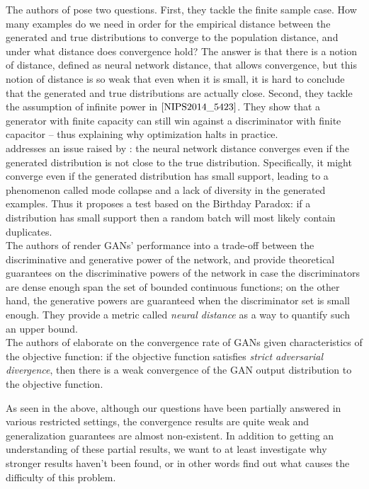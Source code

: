 \documentclass[11pt]{hw-template}
\begin{document}
The authors of \cite{arora2017generalization} pose two questions. First, they tackle the finite sample case. How many examples do we need in order for the empirical distance between the
generated and true distributions to converge to the population distance, and
under what distance does convergence hold? The answer is that there is a notion of distance, defined as neural network distance, that allows convergence, but this notion
of distance is so weak that even when it is small, it is hard to conclude that the generated and true distributions are actually close.
Second, they tackle the assumption of infinite power in $\cite{NIPS2014_5423}$. They show that a generator with finite capacity can
still win against a discriminator with finite capacitor -- thus explaining why optimization halts in practice.\\

\cite{arora2018do} addresses an issue raised by \cite{arora2017generalization}: the neural network distance converges even
if the generated distribution is not close to the true distribution. Specifically, it might converge even if the generated
distribution has small support, leading to a phenomenon called mode collapse and a lack of diversity in the generated
examples. Thus it proposes a test based on the Birthday Paradox: if a distribution has small support then a random
batch will most likely contain duplicates.\\

The authors of \cite{zhang2018on} render GANs' performance
into a trade-off between the discriminative and generative power of the network, and provide theoretical guarantees on the discriminative powers
of the network in case the discriminators are dense enough span the set of bounded continuous functions; on the other hand, the generative powers
are guaranteed when the discriminator set is small enough. They provide a metric called \textit{neural distance} as a way to quantify such an upper bound.\\

The authors of \cite{liu2017approximation} elaborate on the convergence rate of GANs given characteristics of the objective function: if the objective function
satisfies \textit{strict adversarial divergence}, then there is a weak convergence of the GAN output distribution to the objective function.


As seen in the above, although our questions have been partially answered in various restricted settings, the convergence results are quite weak and generalization guarantees are almost non-existent.
In addition to getting an understanding of these partial results, we want to at least investigate why stronger results haven't been found, or in other words find out what causes the difficulty of this problem.




\end{document}

